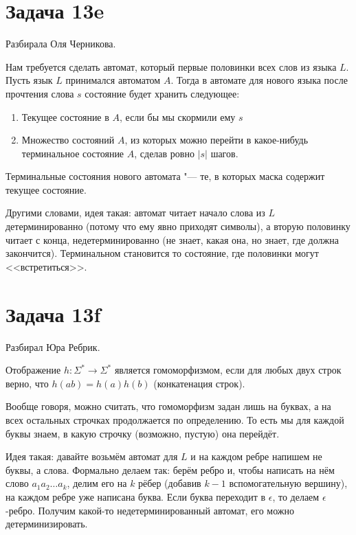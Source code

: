 \section{Задача 13e}\label{prob13e}
	Разбирала Оля Черникова.

	Нам требуется сделать автомат, который первые половинки всех слов из языка $L$.
	Пусть язык $L$ принимался автоматом $A$.
	Тогда в автомате для нового языка после прочтения слова $s$ состояние будет хранить следующее:
	\begin{enumerate}
		\item Текущее состояние в $A$, если бы мы скормили ему $s$
		\item Множество состояний $A$, из которых можно перейти в какое-нибудь терминальное состояние $A$, сделав ровно $|s|$ шагов.
	\end{enumerate}
	Терминальные состояния нового автомата "--- те, в которых маска содержит текущее состояние.

	Другими словами, идея такая: автомат читает начало слова из $L$ детерминированно (потому что ему явно приходят символы),
	а вторую половинку читает с конца, недетерминированно (не знает, какая она, но знает, где должна закончится).
	Терминальном становится то состояние, где половинки могут <<встретиться>>.

\section{Задача 13f}
	Разбирал Юра Ребрик.
	
	\begin{Def}
		Отображение $h \colon \Sigma^* \to \Sigma^* $ является гомоморфизмом, если для любых двух строк верно,
		что $h(ab)=h(a)h(b)$ (конкатенация строк).
	\end{Def}
	\begin{Rem}
		Вообще говоря, можно считать, что гомоморфизм задан лишь на буквах, а на всех остальных строчках продолжается по определению.
		То есть мы для каждой буквы знаем, в какую строчку (возможно, пустую) она перейдёт.
	\end{Rem}

	Идея такая: давайте возьмём автомат для $L$ и на каждом ребре напишем не буквы, а слова.
	Формально делаем так: берём ребро и, чтобы написать на нём слово $a_1a_2\dots a_k$, делим его на $k$ рёбер
	(добавив $k-1$ вспомогательную вершину), на каждом ребре уже написана буква.
	Если буква переходит в $\epsilon$, то делаем $\epsilon$-ребро.
	Получим какой-то недетерминированный автомат, его можно детерминизировать.

